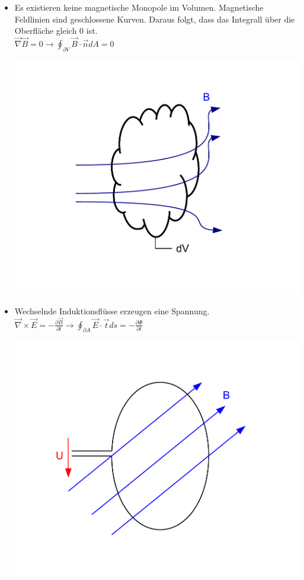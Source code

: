 \documentclass[a4paper, 10pt]{scrartcl}
\begin{document}
\begin{itemize}
	\item Es existieren keine magnetische Monopole im Volumen. Magnetische
	Feldlinien sind geschlossene Kurven. Daraus folgt, dass das Integrall über die
	Oberfläche gleich 0 ist.\\
	$ \vec \nabla \vec B = 0 \rightarrow \oint_{\partial V} \vec B \cdot \vec n
	dA = 0$
	\begin{center}
		\includegraphics[scale=0.5]{images/maxwell_2.pdf}
	\end{center}
	
	\item Wechselnde Induktionsflüsse erzeugen eine Spannung.\\
	$ \vec \nabla \times \vec E = - \frac{\partial \vec B}{\partial t} \rightarrow
	\oint_{\partial A} \vec E \cdot \vec t ds = - \frac{\partial \Phi}{\partial t}$
	\begin{center}
		\includegraphics[scale=0.5]{images/maxwell_3.pdf}
	\end{center}
	

\end{itemize}
\end{document}
